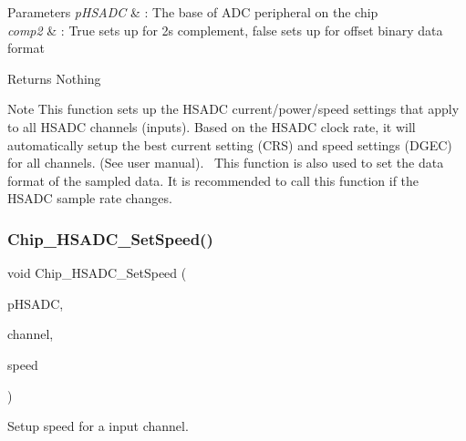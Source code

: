 \begin{DoxyParams}{Parameters}
{\em p\+H\+S\+A\+DC} & \+: The base of A\+DC peripheral on the chip \\
\hline
{\em comp2} & \+: True sets up for 2\textquotesingle{}s complement, false sets up for offset binary data format \\
\hline
\end{DoxyParams}
\begin{DoxyReturn}{Returns}
Nothing 
\end{DoxyReturn}
\begin{DoxyNote}{Note}
This function sets up the H\+S\+A\+DC current/power/speed settings that apply to all H\+S\+A\+DC channels (inputs). Based on the H\+S\+A\+DC clock rate, it will automatically setup the best current setting (C\+RS) and speed settings (D\+G\+EC) for all channels. (See user manual).~\newline
 This function is also used to set the data format of the sampled data. It is recommended to call this function if the H\+S\+A\+DC sample rate changes. 
\end{DoxyNote}
\mbox{\label{group___h_s_a_d_c__18_x_x__43_x_x_ga70b879056a35cdf9cc6f9c2928883973}} 
\subsubsection{\texorpdfstring{Chip\+\_\+\+H\+S\+A\+D\+C\+\_\+\+Set\+Speed()}{Chip\_HSADC\_SetSpeed()}}
{\footnotesize\ttfamily void Chip\+\_\+\+H\+S\+A\+D\+C\+\_\+\+Set\+Speed (\begin{DoxyParamCaption}\item[{\hyperlink{struct_l_p_c___h_s_a_d_c___t}{L\+P\+C\+\_\+\+H\+S\+A\+D\+C\+\_\+T} $\ast$}]{p\+H\+S\+A\+DC,  }\item[{uint8\+\_\+t}]{channel,  }\item[{uint8\+\_\+t}]{speed }\end{DoxyParamCaption})}



Setup speed for a input channel. 


